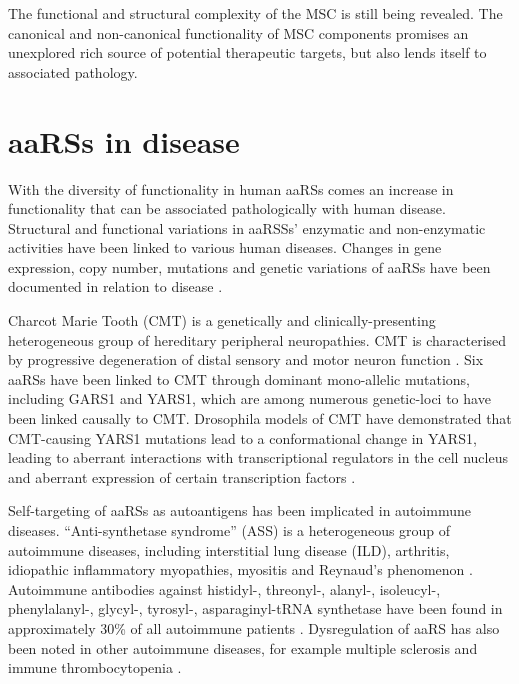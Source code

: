The functional and structural complexity of the MSC is still being revealed.
The canonical and non-canonical functionality of MSC components promises an unexplored rich source of potential therapeutic targets, but also lends itself to associated pathology.

\section{aaRSs in disease}
With the diversity of functionality in human aaRSs comes an increase in functionality that can be associated pathologically with human disease.
Structural and functional variations in aaRSSs' enzymatic and non-enzymatic activities have been linked to various human diseases.
Changes in gene expression, copy number, mutations and genetic variations of aaRSs have been documented in relation to disease \cite{kwon2019aminoacyl}.

Charcot Marie Tooth (CMT) is a genetically and clinically-presenting heterogeneous group of hereditary peripheral neuropathies.
CMT is characterised by progressive degeneration of distal sensory and motor neuron function \cite{yao2013aminoacyl}.
Six aaRSs have been linked to CMT through dominant mono-allelic mutations, including GARS1 and YARS1, which are among numerous genetic-loci to have been linked causally to CMT.
Drosophila models of CMT have demonstrated that CMT-causing YARS1 mutations lead to a conformational change in YARS1, leading to aberrant interactions with transcriptional regulators in the cell nucleus and aberrant expression of certain transcription factors \cite{bervoets2019transcriptional}.

Self-targeting of aaRSs as autoantigens has been implicated in autoimmune diseases.
``Anti-synthetase syndrome'' (ASS) is a heterogeneous group of autoimmune diseases, including interstitial lung disease (ILD), arthritis, idiopathic inflammatory myopathies, myositis and Reynaud's phenomenon \cite{park2008aminoacyl}.
Autoimmune antibodies against histidyl-, threonyl-, alanyl-, isoleucyl-, phenylalanyl-, glycyl-, tyrosyl-, asparaginyl-tRNA synthetase have been found in approximately 30\% of all autoimmune patients \cite{park2008aminoacyl}.
Dysregulation of aaRS has also been noted in other autoimmune diseases, for example multiple sclerosis and immune thrombocytopenia \cite{nie2019roles}.

